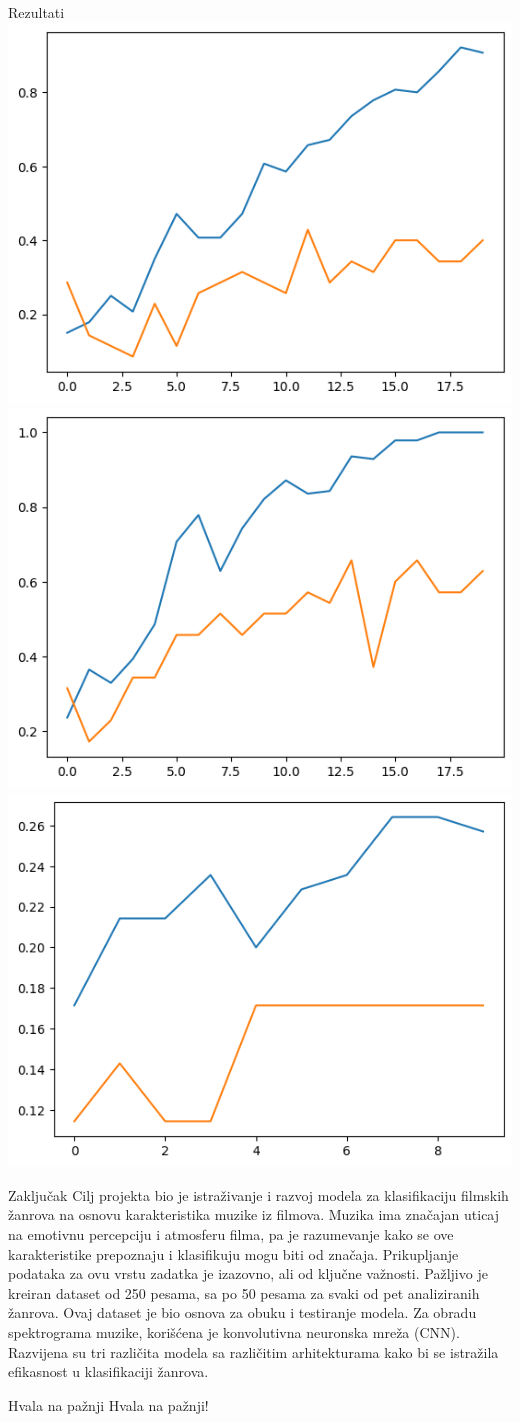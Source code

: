 \documentclass{beamer}
\begin{document}
\begin{frame}{Rezultati}
\centering
\includegraphics[width=0.4\linewidth]{slike/1acc.png}
\includegraphics[width=0.4\linewidth]{slike/2acc.png}
\includegraphics[width=0.4\linewidth]{slike/3acc.png}
\end{frame}

\begin{frame}{Zaključak}
Cilj projekta bio je istraživanje i razvoj modela za klasifikaciju filmskih žanrova na osnovu karakteristika muzike iz filmova. Muzika ima značajan uticaj na emotivnu percepciju i atmosferu filma, pa je razumevanje kako se ove karakteristike prepoznaju i klasifikuju mogu biti od značaja. Prikupljanje podataka za ovu vrstu zadatka je izazovno, ali od ključne važnosti. Pažljivo je kreiran dataset od 250 pesama, sa po 50 pesama za svaki od pet analiziranih žanrova. Ovaj dataset je bio osnova za obuku i testiranje modela. Za obradu spektrograma muzike, korišćena je konvolutivna neuronska mreža (CNN). Razvijena su tri različita modela sa različitim arhitekturama kako bi se istražila efikasnost u klasifikaciji žanrova.
\end{frame}

\begin{frame}{Hvala na pažnji}
\centering
\Huge Hvala na pažnji!
\end{frame}
\end{document}
